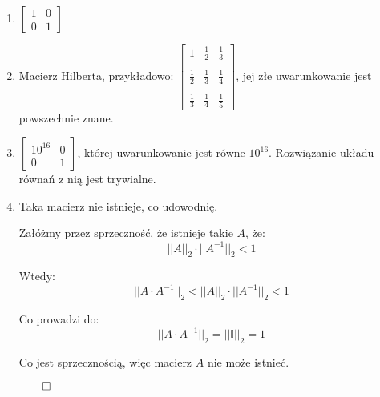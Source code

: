 \documentclass[a4paper]{article}
\newcommand{\I}{\mathbb I} %
\begin{document}
        \begin{enumerate}[label=(\alph*)]
            \item
                $\begin{bmatrix}
                    1 & 0 \\
                    0 & 1
                \end{bmatrix}$

            \item
                Macierz Hilberta, przykładowo:
                $\begin{bmatrix}
                     1           & \frac{1}{2} & \frac{1}{3} \\ \\
                     \frac{1}{2} & \frac{1}{3} & \frac{1}{4} \\ \\
                     \frac{1}{3} & \frac{1}{4} & \frac{1}{5}
                \end{bmatrix}$, jej złe uwarunkowanie jest powszechnie znane.

            \item
                $\begin{bmatrix}
                     10^{16} & 0 \\
                     0       & 1
                \end{bmatrix}$,
                której uwarunkowanie jest równe $10^{16}$.
                Rozwiązanie układu równań z nią jest trywialne.

            \item
                Taka macierz nie istnieje, co udowodnię.

                Załóżmy przez sprzeczność, że istnieje takie $A$, że:
                \[||A||_{2} \cdot ||A^{-1}||_{2} < 1\]

                Wtedy:
                \[||A \cdot A^{-1}||_{2} < ||A||_{2} \cdot ||A^{-1}||_{2} < 1\]

                Co prowadzi do:
                \[||A \cdot A^{-1}||_{2} = ||\I||_{2} = 1\]

                Co jest sprzecznością, więc macierz $A$ nie może istnieć.

                $\qed$

        \end{enumerate}
\end{document}
